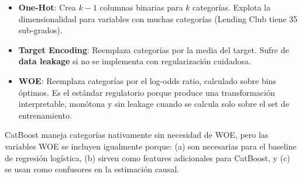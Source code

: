 \documentclass[
  spanish,
  11pt,
  letterpaper,
]{scrbook}
\providecommand{\tightlist}{%
  \setlength{\itemsep}{0pt}\setlength{\parskip}{0pt}}
\theoremstyle{plain}
\theoremstyle{remark}
\begin{document}
\begin{tcolorbox}[enhanced jigsaw, arc=.35mm, bottomrule=.15mm, bottomtitle=1mm, breakable, colback=white, colbacktitle=quarto-callout-note-color!10!white, colframe=quarto-callout-note-color-frame, coltitle=black, left=2mm, leftrule=.75mm, opacityback=0, opacitybacktitle=0.6, rightrule=.15mm, title=\textcolor{quarto-callout-note-color}{\faInfo}\hspace{0.5em}{WOE vs.~One-Hot Encoding vs.~Target Encoding}, titlerule=0mm, toprule=.15mm, toptitle=1mm]

\begin{itemize}
\tightlist
\item
  \textbf{One-Hot}: Crea \(k-1\) columnas binarias para \(k\)
  categorías. Explota la dimensionalidad para variables con muchas
  categorías (Lending Club tiene 35 sub-grados).
\item
  \textbf{Target Encoding}: Reemplaza categorías por la media del
  target. Sufre de \textbf{data leakage} si no se implementa con
  regularización cuidadosa.
\item
  \textbf{WOE}: Reemplaza categorías por el log-odds ratio, calculado
  sobre bins óptimos. Es el estándar regulatorio porque produce una
  transformación interpretable, monótona y sin leakage cuando se calcula
  solo sobre el set de entrenamiento.
\end{itemize}

CatBoost maneja categorías nativamente sin necesidad de WOE, pero las
variables WOE se incluyen igualmente porque: (a) son necesarias para el
baseline de regresión logística, (b) sirven como features adicionales
para CatBoost, y (c) se usan como confusores en la estimación causal.

\end{tcolorbox}
\end{document}
